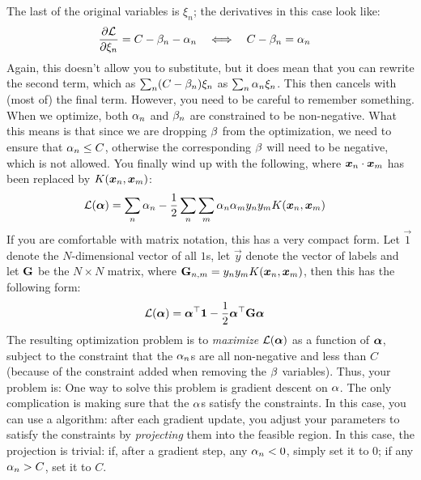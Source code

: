 The last of the original variables is $\xi_n$; the derivatives in this
case look like:
%
\begin{align}
\frac {\partial \mathcal{L}} {\partial \xi_n}
&= C - \beta_n - \alpha_n
\quad \Longleftrightarrow \quad
C - \beta_n = \alpha_n
\end{align}
%
Again, this doesn't allow you to substitute, but it does mean that you
can rewrite the second term, which as $\sum_n (C-\beta_n)\xi_n$ as
$\sum_n \alpha_n \xi_n$.  This then cancels with (most of) the final
term.  However, you need to be careful to remember something.  When we
optimize, both $\alpha_n$ and $\beta_n$ are constrained to be non-negative.
What this means is that since we are dropping $\beta$ from the
optimization, we need to ensure that $\alpha_n \leq C$, otherwise the
corresponding $\beta$ will need to be negative, which is not allowed.
You finally wind up with the following, where ${\boldsymbol{x}}_n \cdot {\boldsymbol{x}}_m$
has been replaced by $K({\boldsymbol{x}}_n,{\boldsymbol{x}}_m)$:
%
\begin{align}
\mathcal{L}(\boldsymbol{\alpha})
&=
\sum_n \alpha_n
- \frac 1 2
    \sum_n \sum_m \alpha_n \alpha_m y_n y_m K({\boldsymbol{x}}_n,{\boldsymbol{x}}_m)
\end{align}
%
If you are comfortable with matrix notation, this has a very compact
form.  Let $\vec 1$ denote the $N$-dimensional vector of all $1$s, 
let $\vec y$ denote the vector of labels and let $\text{\bf G}$ be the $N
\times N$ matrix, where $\text{\bf G}_{n,m} = y_n y_m K({\boldsymbol{x}}_n, {\boldsymbol{x}}_m)$, then this
has the following form:
%
\begin{align}
\mathcal{L}(\boldsymbol{\alpha})
&=
\boldsymbol{\alpha}{}^\top\boldsymbol{1}
- \frac 1 2 \boldsymbol{\alpha}{}^\top \text{\bf G} \boldsymbol{\alpha}
\end{align}
%
The resulting optimization problem is to \emph{maximize}
$\mathcal{L}(\boldsymbol{\alpha})$ as a function of $\boldsymbol{\alpha}$, subject to the constraint
that the $\alpha_n$s are all non-negative and less than $C$ (because of
the constraint added when removing the $\beta$ variables).  Thus, your
problem is:
%
%
One way to solve this problem is gradient descent on $\alpha$.  The only
complication is making sure that the $\alpha$s satisfy the constraints.
In this case, you can use a  algorithm:
after each gradient update, you adjust your parameters to satisfy the
constraints by \emph{projecting} them into the feasible region.  In
this case, the projection is trivial: if, after a gradient step, any
$\alpha_n < 0$, simply set it to $0$; if any $\alpha_n > C$, set it to $C$.

